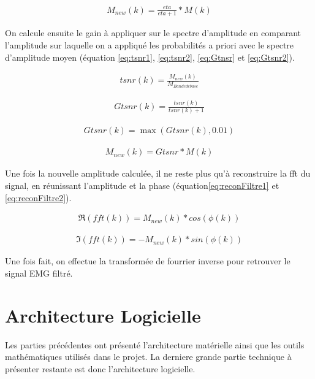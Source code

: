 \documentclass[letterpaper, twoside, 12pt, memoire, creativecommons, hyperref]{thETS}
\begin{document}
\begin{align}\label{eq:newMagEta}
   M_{new}(k) = \frac{eta}{eta+1} * M(k)
\end{align}

On calcule ensuite le gain à appliquer sur le spectre d'amplitude en comparant l'amplitude sur laquelle on a appliqué les probabilités a priori avec le spectre d'amplitude moyen (équation \ref{eq:tsnr1}, \ref{eq:tsnr2}, \ref{eq:Gtnsr} et \ref{eq:Gtsnr2}).

 \begin{align}\label{eq:tsnr1}
   tsnr(k) = \frac{M_{new}(k)}{M_{Bande de base}}
\end{align}

 \begin{align}\label{eq:tsnr2}
   Gtsnr(k) = \frac{tsnr(k)}{tsnr(k)+1}
\end{align}

 \begin{align}\label{eq:Gtnsr}
   Gtsnr(k) = \max(Gtsnr(k), 0.01)
\end{align}

\begin{align}\label{eq:Gtsnr2}
   M_{new}(k) = Gtsnr * M(k)
\end{align}

Une fois la nouvelle amplitude calculée, il ne reste plus qu'à reconstruire la fft du signal, en réunissant l'amplitude et la phase (équation\ref{eq:reconFiltre1} et \ref{eq:reconFiltre2}).

\begin{align}\label{eq:reconFiltre1}
   \Re(fft(k)) = M_{new}(k) * cos(\phi(k))
\end{align}

\begin{align}\label{eq:reconFiltre2}
   \Im(fft(k)) = -M_{new}(k) * sin(\phi(k))
\end{align}

Une fois fait, on effectue la transformée de fourrier inverse pour retrouver le signal EMG filtré.

\section{Architecture Logicielle}

Les parties précédentes ont présenté l'architecture matérielle ainsi que les outils mathématiques utilisés dans le projet. La derniere grande partie technique à présenter restante est donc l'architecture logicielle. 
\end{document}
